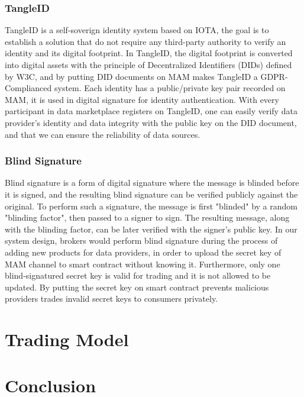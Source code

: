 \documentclass[journal,a4paper]{IEEEtran}
\begin{document}
\subsubsection{TangleID}
TangleID\cite{TangleID} is a self-soverign identity system based on IOTA, the goal is to establish a solution that do not require any third-party authority to verify an identity and its digital footprint. In TangleID, the digital footprint is converted into digital assets with the principle of Decentralized Identifiers (DIDs)\cite{DID} defined by W3C, and by putting DID documents on MAM makes TangleID a GDPR-Complianced system. Each identity has a public/private key pair recorded on MAM, it is used in digital signature for identity authentication. With every participant in data marketplace registers on TangleID, one can easily verify data provider's identity and data integrity with the public key on the DID document, and that we can ensure the reliability of data sources.


\subsubsection{Blind Signature}
Blind signature\cite{blindSig} is a form of digital signature where the message is blinded before it is signed, and the resulting blind signature can be verified publicly against the original. To perform such a signature, the message is first "blinded" by a random "blinding factor", then passed to a signer to sign. The resulting message, along with the blinding factor, can be later verified with the signer's public key. In our system design, brokers would perform blind signature during the process of adding new products for data providers, in order to upload the secret key of MAM channel to smart contract without knowing it. Furthermore, only one blind-signatured secret key is valid for trading and it is not allowed to be updated. By putting the secret key on smart contract prevents malicious providers trades invalid secret keys to consumers privately. 

\section{Trading Model}

\section{Conclusion}



  







\end{document}
